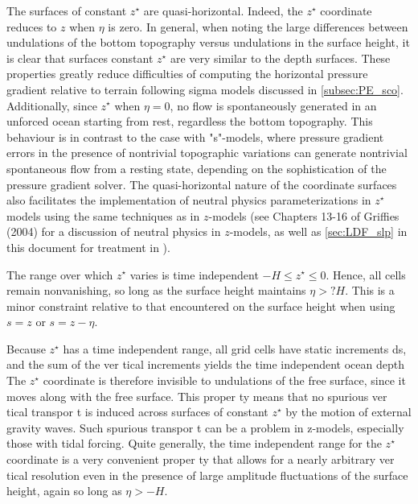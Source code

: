 \documentclass[../tex_main/NEMO_manual]{subfiles}
\begin{document}
The surfaces of constant $z^\star$ are quasi-horizontal. Indeed, the $z^\star$ coordinate reduces to $z$ when $\eta$ is zero. In general, when noting the large differences between 
undulations of the bottom topography versus undulations in the surface height, it 
is clear that surfaces constant $z^\star$ are very similar to the depth surfaces. These properties greatly reduce difficulties of computing the horizontal pressure gradient relative to terrain following sigma models discussed in \autoref{subsec:PE_sco}. 
Additionally, since $z^\star$ when $\eta = 0$, no flow is spontaneously generated in an 
unforced ocean starting from rest, regardless the bottom topography. This behaviour is in contrast to the case with "s"-models, where pressure gradient errors in 
the presence of nontrivial topographic variations can generate nontrivial spontaneous flow from a resting state, depending on the sophistication of the pressure 
gradient solver. The quasi-horizontal nature of the coordinate surfaces also facilitates the implementation of neutral physics parameterizations in $z^\star$ models using 
the same techniques as in $z$-models (see Chapters 13-16 of Griffies (2004) for a 
discussion of neutral physics in $z$-models, as well as  \autoref{sec:LDF_slp} 
in this document for treatment in \NEMO). 

The range over which $z^\star$ varies is time independent $-H \leq z^\star \leq 0$. Hence, all 
cells remain nonvanishing, so long as the surface height maintains $\eta > ?H$. This 
is a minor constraint relative to that encountered on the surface height when using 
$s = z$ or $s = z - \eta$. 

Because $z^\star$ has a time independent range, all grid cells have static increments 
ds, and the sum of the ver tical increments yields the time independent ocean 
depth %
The $z^\star$ coordinate is therefore invisible to undulations of the 
free surface, since it moves along with the free surface. This proper ty means that 
no spurious ver tical transpor t is induced across surfaces of constant $z^\star$ by the 
motion of external gravity waves. Such spurious transpor t can be a problem in 
z-models, especially those with tidal forcing. Quite generally, the time independent 
range for the $z^\star$ coordinate is a very convenient proper ty that allows for a nearly 
arbitrary ver tical resolution even in the presence of large amplitude fluctuations of 
the surface height, again so long as $\eta > -H$. 



\end{document}
